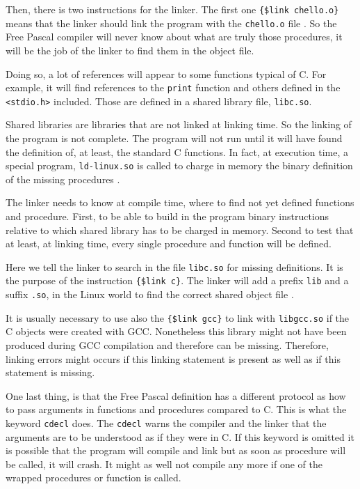 \documentclass[A4paper]{article}
\begin{document}
Then, there is two instructions for the linker. The first one
\hspace{0cm}\verb|{$link chello.o}| %
 means that the linker should link the program with the \verb|chello.o|
file \cite{FPDoc,FPFor}. So the Free Pascal compiler will never know about
what are truly those procedures, it will be the job of the linker to find
them in the object file.

Doing so, a lot of references will appear to some functions typical of C. For
example, it will find references to the \verb|print| function and others
defined in the \verb|<stdio.h>| included. Those are defined in a shared
library file, \verb|libc.so|.

Shared libraries are libraries that are not linked at linking time. So the
linking of the program is not complete. The program will not run until it
will have found the definition of, at least, the standard C functions. In
fact, at execution time, a special program, \verb|ld-linux.so| is called to
charge in memory the binary definition of the missing procedures
\cite{Drep2006}.

The linker needs to know at compile time, where to find not yet defined
functions and procedure. First, to be able to build in the program binary
instructions relative to which shared library has to be charged in
memory. Second to test that at least, at linking time, every single procedure
and function will be defined.

Here we tell the linker to search in the file \verb|libc.so| for
missing definitions. It is the purpose of the instruction \verb|{$link c}|.%
The linker will add a prefix \verb|lib| and a suffix \verb|.so|, in the Linux
world to find the correct shared object file \cite{FPDoc,FPFor}.

It is usually necessary to use also the \verb|{$link gcc}|%
to link with \verb|libgcc.so| if the C objects were created with
GCC. Nonetheless this library might not have been produced
during GCC compilation and therefore can be missing. Therefore, linking errors
might occurs if this linking statement is present as well as if this statement
is missing.

One last thing, is that the Free Pascal definition has a different protocol as
how to pass arguments in functions and procedures compared to C. This is what
the keyword \verb|cdecl| does. The \verb|cdecl| warns the compiler and
the linker that the arguments are to be understood as if they were in
C\cite{FPDoc,FPFor}. If
this keyword is omitted it is possible that the program will compile and link
but as soon as procedure will be called, it will crash. It might as well not
compile any more if one of the wrapped procedures or function is called.
\end{document}
